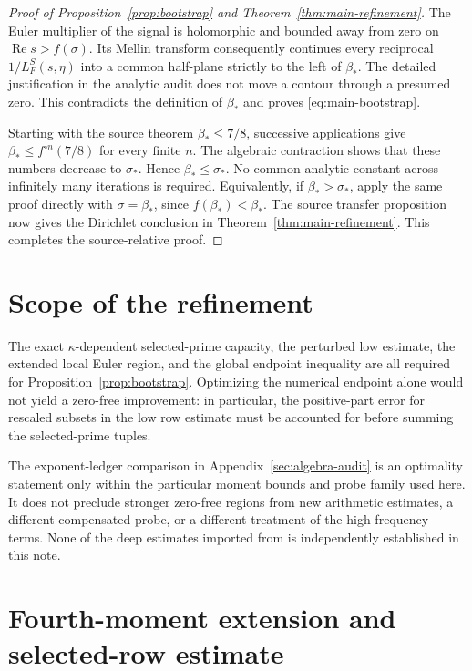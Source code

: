 \documentclass[11pt,a4paper]{article}
\numberwithin{equation}{section}
\theoremstyle{remark}
\newcommand{\Rea}{\operatorname{Re}}
\begin{document}
\begin{proof}[Proof of Proposition~\ref{prop:bootstrap} and Theorem~\ref{thm:main-refinement}]
The Euler multiplier of the signal is holomorphic and bounded away
from zero on $\Rea s>f(\sigma)$. Its Mellin transform consequently
continues every reciprocal $1/L_F^S(s,\eta)$ into a common half-plane
strictly to the left of $\beta_*$. The detailed justification in the
analytic audit does not move a contour through a presumed zero. This
contradicts the definition of $\beta_*$ and proves
\eqref{eq:main-bootstrap}.

Starting with the source theorem $\beta_*\le7/8$, successive
applications give $\beta_*\le f^{\circ n}(7/8)$ for every finite $n$.
The algebraic contraction shows that these numbers decrease to
$\sigma_*$. Hence $\beta_*\le\sigma_*$. No common analytic constant
across infinitely many iterations is required. Equivalently,
if $\beta_*>\sigma_*$, apply the same proof directly with
$\sigma=\beta_*$, since $f(\beta_*)<\beta_*$.
The source transfer proposition now gives the Dirichlet conclusion
in Theorem~\ref{thm:main-refinement}. This completes the source-relative proof.
\end{proof}

\section{Scope of the refinement}
\label{sec:scope}
The exact $\kappa$-dependent selected-prime capacity, the perturbed
low estimate, the extended local Euler region, and the global endpoint
inequality are all required for Proposition~\ref{prop:bootstrap}.
Optimizing the numerical endpoint alone would not yield a zero-free
improvement: in particular, the positive-part error for rescaled
subsets in the low row estimate must be accounted for before summing
the selected-prime tuples.

The exponent-ledger comparison in Appendix~\ref{sec:algebra-audit}
is an optimality statement only within the particular moment bounds
and probe family used here. It does not preclude stronger zero-free
regions from new arithmetic estimates, a different compensated probe,
or a different treatment of the high-frequency terms. None of the
deep estimates imported from \cite{OA} is independently established
in this note.

\appendix

\section{Fourth-moment extension and selected-row estimate}
\label{sec:extended-moment-audit}
\end{document}
